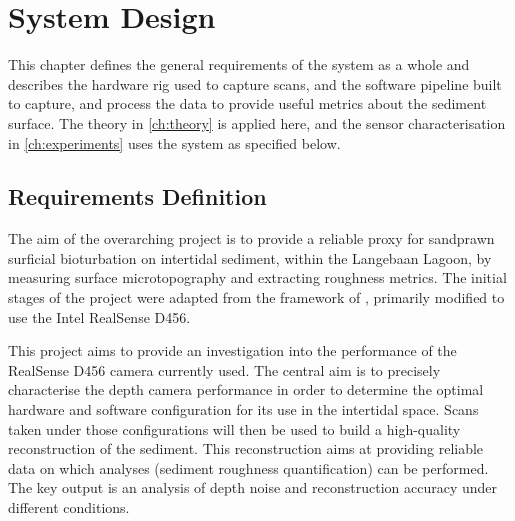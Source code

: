 
\chapter{System Design}
\label{ch:design}
This chapter defines the general requirements of the system as a whole and describes the hardware rig used to capture scans, and the software pipeline built to capture, and process the data to provide useful metrics about the sediment surface. The theory in \autoref{ch:theory} is applied here, and the sensor characterisation in \autoref{ch:experiments} uses the system as specified below.

\section{Requirements Definition}
The aim of the overarching project is to provide a reliable proxy for sandprawn surficial bioturbation on intertidal sediment, within the Langebaan Lagoon, by measuring surface microtopography and extracting roughness metrics. The initial stages of the project were adapted from the framework of \citet{azharRGBDFrameworkCapturing2022}, primarily modified to use the Intel RealSense D456.

This project aims to provide an investigation into the performance of the RealSense D456 camera currently used. The central aim is to precisely characterise the depth camera performance in order to determine the optimal hardware and software configuration for its use in the intertidal space. Scans taken under those configurations will then be used to build a high-quality reconstruction of the sediment. This reconstruction aims at providing reliable data on which analyses (sediment roughness quantification) can be performed. The key output is an analysis of depth noise and reconstruction accuracy under different conditions.



